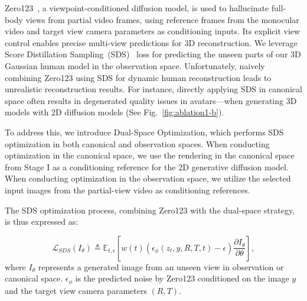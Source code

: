 Zero123~\cite{liu2023zero1to3}, a viewpoint-conditioned diffusion model, is used to hallucinate full-body views from partial video frames, using reference frames from the monocular video and target view camera parameters as conditioning inputs.
Its explicit view control enables precise multi-view predictions for 3D reconstruction.  We leverage Score Distillation Sampling~(SDS)~\cite{poole2022dreamfusion} loss for predicting the unseen parts of our 3D Gaussian human model in the observation space. Unfortunately, naively combining Zero123 using SDS for dynamic human reconstruction leads to unrealistic reconstruction results. For instance, directly applying SDS in canonical space often results in degenerated quality issues in avatars—when generating 3D models with 2D diffusion models (See Fig.~\ref{fig:ablation1-b}).


To address this, we introduce Dual-Space Optimization, which performs SDS optimization in both canonical and observation spaces. When conducting optimization in the canonical space, we use the rendering in the canonical space from Stage I as a conditioning reference for the 2D generative diffusion model. When conducting optimization in the observation space, we utilize the selected input images from the partial-view video as conditioning references.

The SDS optimization process, combining Zero123 with the dual-space strategy, is thus expressed as:


\begin{equation}
  \mathcal{L}_{SDS}(I_{\theta})\triangleq \mathbb{E}_{t,\epsilon}[w(t)(\epsilon_{\phi}(z_t,y,R,T,t)-\epsilon)\frac{\partial I_{\theta}}{\partial\theta}],
  \label{eq:SDSObservOur}
\end{equation}
where $I_{\theta}$ represents a generated image from an unseen view in observation or canonical space.  $\epsilon_{\phi}$ is the predicted noise by Zero123 conditioned on the image $y$ and the target view camera parameters $(R, T)$.

